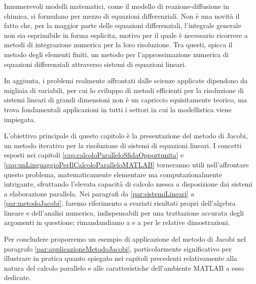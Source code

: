 Innumerevoli modelli matematici, come il modello di reazione-diffusione in chimica, si formulano per mezzo di equazioni
differenziali. \newline
Non \`e una novit\`a il fatto che, per la maggior parte delle equazioni differenziali, l'integrale generale non sia esprimibile in forma esplicita, motivo per il quale \`e
necessario ricorrere a metodi di integrazione numerica per la loro risoluzione.\newline
Tra questi, spicca il metodo degli elementi finiti, un metodo per l'approssimazione numerica di equazioni differenziali
attraverso sistemi di equazioni lineari.

In aggiunta, i problemi realmente affrontati dalle scienze applicate dipendono da migliaia di variabili, per cui lo sviluppo di metodi efficienti per la risoluzione di sistemi lineari di grandi
dimensioni non \`e un capriccio squisitamente teorico, ma trova fondamentali applicazioni in tutti i settori in cui la modellistica viene impiegata.

L'obiettivo principale di questo capitolo \`e la presentazione del metodo di Jacobi, un metodo iterativo per la risoluzione di sistemi di equazioni lineari.\newline
I concetti esposti nei capitoli \ref{cap:calcoloParalleloSfidaOpportunita} e \ref{cap:unLinguaggioPerIlCalcoloParalleloMATLAB} torneranno utili nell'affrontare questo problema, matematicamente elementare ma computazionalmente
intrigante, sfruttando l'elevata capacit\`a di calcolo messa a disposizione dai sistemi a elaborazione parallela.\newline
Nei paragrafi da \ref{par:sistemiLineari} a \ref{par:metodoJacobi}, faremo riferimento a svariati risultati propri dell'algebra lineare e dell'analisi numerica, indispensabili per una trattazione accurata degli
argomenti in questione; rimandandiamo a \cite{Betti2000} e a \cite{Quarteroni2002} per le relative dimostrazioni.

Per concludere proporremo un esempio di applicazione del metodo di Jacobi nel paragrafo \ref{par:applicazioneMetodoJacobi},
particolarmente significativo per illustrare in pratica quanto spiegato nei capitoli precedenti relativamente alla natura del calcolo parallelo
e alle caratteristiche dell'ambiente MATLAB a esso dedicate.